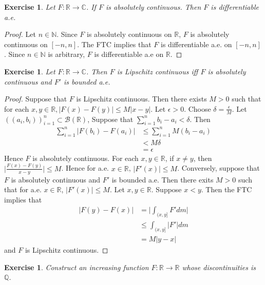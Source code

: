 \documentclass[12pt]{amsart}
\newtheorem{ex}[thm]{Exercise}
\newcommand{\del}{\delta}
\newcommand{\ep}{\epsilon}
\newcommand{\C}{\mathbb{C}}
\newcommand{\N}{\mathbb{N}}
\newcommand{\R}{\mathbb{R}}
\newcommand{\Q}{\mathbb{Q}}
\newcommand{\MB}{\mathcal{B}}
\begin{document}
\begin{ex}
Let $F: \R \rightarrow \C$. If $F$ is absolutely continuous. Then $F$ is differentiable a.e.
\end{ex}

\begin{proof}
Let $n \in \N$. Since $F$ is absolutely continuous on $\R$, $F$ is absolutely continuous on $[-n,n]$. The FTC implies that $F$ is differentiable a.e. on $[-n,n]$. Since $n \in \N$ is arbitrary, $F$ is differentiable a.e on $\R$.
\end{proof}

\begin{ex}
Let $F: \R \rightarrow \C$. Then $F$ is Lipschitz continuous iff $F$ is absolutely continuous and $F'$ is bounded a.e.
\end{ex}

\begin{proof}
Suppose that $F$ is Lipschitz continuous. Then there exists $M>0$ such that for each $x,y \in \R, |F(x)-F(y)| \leq M|x-y|$. Let $\ep >0$. Choose $\del = \frac{\ep}{M}$. Let $((a_i, b_i))_{i=1}^n \subset \MB(\R)$, Suppose that $\sum_{i=1}^n b_i-a_i < \del$. Then 
\begin{align*}
\sum_{i=1}^n|F(b_i)-F(a_i)| 
&\leq \sum_{i=1}^n M(b_i - a_i)\\
&< M\del\\
&= \ep
\end{align*}
Hence $F$ is absolutely continuous. For each $x, y \in \R$, if $x \neq y$, then $\bigg|\frac{F(x)-F(y)}{x-y}\bigg| \leq M$. Hence for a.e. $x \in \R$, $|F'(x)| \leq M$. Conversely, suppose that $F$ is absolutely continuous and $F'$ is bounded a.e. Then there exits $M> 0$ such that for a.e. $x \in \R$, $|F'(x)| \leq M$. Let $x,y \in \R$. Suppose $x<y$. Then the FTC implies that 
\begin{align*}
|F(y)-F(x)|
& = \bigg|\int_{(x,y]}F'dm\bigg|\\
&\leq \int_{(x,y]}|F'|dm\\
&=M|y-x|
\end{align*}
and $F$ is Lipschitz continuous.
\end{proof}

\begin{ex}
Construct an increasing function $F: \R \rightarrow \R$ whose discontinuities is $\Q$.
\end{ex}
\end{document}
